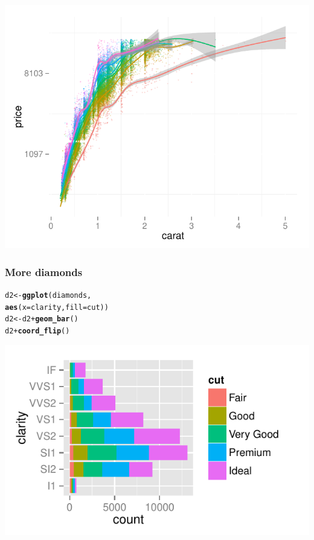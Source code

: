 \documentclass{beamer}\usepackage{graphicx, color}
\makeatletter
\def\maxwidth{ %
  \ifdim\Gin@nat@width>\linewidth
    \linewidth
  \else
    \Gin@nat@width
  \fi
}
\newcommand{\hlfunctioncall}[1]{\textcolor[rgb]{0.501960784313725,0,0.329411764705882}{\textbf{#1}}}%
\newenvironment{kframe}{%
 \def\at@end@of@kframe{}%
 \ifinner\ifhmode%
  \def\at@end@of@kframe{\end{minipage}}%
  \begin{minipage}{\columnwidth}%
 \fi\fi%
 \def\FrameCommand##1{\hskip\@totalleftmargin \hskip-\fboxsep
 \colorbox{shadecolor}{##1}\hskip-\fboxsep
     \hskip-\linewidth \hskip-\@totalleftmargin \hskip\columnwidth}%
 \MakeFramed {\advance\hsize-\width
   \@totalleftmargin\z@ \linewidth\hsize
   \@setminipage}}%
 {\par\unskip\endMakeFramed%
 \at@end@of@kframe}
\newenvironment{knitrout}{}{} %
\makeatother
\begin{document}
\begin{frame}[fragile]
\begin{knitrout}
\color{fgcolor}
\includegraphics[width=\maxwidth]{figure/dia2-plot} 

\end{knitrout}

\end{frame}

\begin{frame}[fragile]
  \frametitle{More diamonds}
\begin{knitrout}
\color{fgcolor}\begin{kframe}
\begin{alltt}
d2 <- \hlfunctioncall{ggplot}(diamonds, 
             \hlfunctioncall{aes}(x = clarity, fill = cut))
d2 <- d2 + \hlfunctioncall{geom_bar}()
d2 + \hlfunctioncall{coord_flip}()
\end{alltt}
\end{kframe}
\includegraphics[width=\maxwidth]{figure/dia3} 

\end{knitrout}

\end{frame}
\end{document}
